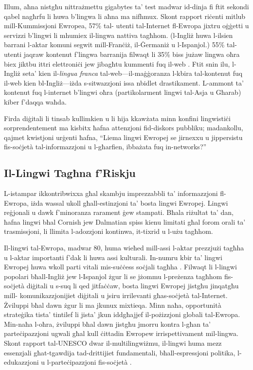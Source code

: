 \documentclass[]{../../metanetpaper}
\begin{document}
\begin{multicols}{2}


Illum, aħna nistgħu nittrażmettu gigabytes ta’ test madwar id-dinja fi ftit sekondi qabel nagħrfu li huwa b’lingwa li aħna ma nifhmux. Skont rapport riċenti mitlub mill-Kummissjoni Ewropea, 57\% tal- utenti tal-Internet fl-Ewropa jixtru oġġetti u servizzi b’lingwi li mhumiex il-lingwa nattiva tagħhom. (l-Ingliż huwa l-ilsien barrani l-aktar komuni segwit mill-Franċiż, il-Ġermaniż u l-Ispanjol.) 55\% tal-utenti jaqraw kontenut f'lingwa barranija filwaqt li 35\% biss jużaw lingwa oħra biex jiktbu ittri elettroniċi jew jibagħtu kummenti fuq il-web \cite{EC1}.  Ftit snin ilu, l-Ingliż seta’ kien il-\emph{lingua franca} tal-web—il-maġġoranza l-kbira tal-kontenut fuq il-web kien bl-Ingliż—iżda s-sitwazzjoni issa nbidlet drastikament. L-ammont ta’ kontenut fuq l-internet b’lingwi oħra (partikolarment lingwi tal-Asja u Għarab) kiber f'daqqa waħda.

Firda diġitali li tinsab kullimkien u li hija kkawżata minn konfini lingwistiċi sorprendentement ma kisbitx ħafna attenzjoni fid-diskors pubbliku; madankollu, qajmet kwistjoni urġenti ħafna, ``Liema lingwi Ewropej se jirnexxu u jippersistu fis-soċjetà tal-informazzjoni u l-għarfien, ibbażata fuq in-networks?''

\subsection{Il-Lingwi Tagħna f’Riskju}

L-istampar ikkontribwixxa għal skambju imprezzabbli ta’ informazzjoni fl-Ewropa, iżda wassal ukoll għall-estinzjoni ta’ bosta lingwi Ewropej. Lingwi reġjonali u dawk f’minoranza rarament ġew stampati. Bħala riżultat ta’ dan, ħafna lingwi bħal Cornish jew Dalmatian spiss kienu limitati għal forom orali ta’ trasmissjoni, li llimita l-adozzjoni kontinwa, it-tixrid u l-użu tagħhom.

  
Il-lingwi  tal-Ewropa, madwar 80, huma wieħed mill-assi l-aktar prezzjużi tagħha u l-aktar importanti f’dak li huwa assi kulturali. In-numru kbir ta’ lingwi Ewropej huwa wkoll parti vitali mis-suċċess soċjali tagħha \cite{EC2}.  Filwaqt li l-lingwi popolari bħall-Ingliż jew l-Ispanjol żgur li se jżommu l-preżenza tagħhom fis-soċjetà diġitali u s-suq li qed jitfaċċaw, bosta lingwi Ewropej jistgħu jinqatgħu mill- komunikazzjonijiet diġitali u jsiru irrilevanti għas-soċjetà tal-Internet. Żviluppi bħal dawn żgur li ma jkunux mixtieqa. Minn naħa, opportunità strateġika tista’ tintilef li jista’ jkun iddgħajjef il-pożizzjoni globali tal-Ewropa. Min-naħa l-oħra, żviluppi bħal dawn jistgħu jmorru kontra l-għan ta’ parteċipazzjoni ugwali għal kull ċittadin Ewropew irrispettivament mil-lingwa. Skont rapport tal-UNESCO dwar il-multilingwiżmu, il-lingwi huma mezz essenzjali għat-tgawdija tad-drittijiet fundamentali, bħall-espressjoni politika, l-edukazzjoni u l-parteċipazzjoni fis-soċjetà \cite{Unesco1}.


\end{multicols}
\end{document}
